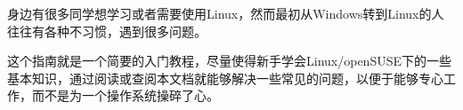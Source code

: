 身边有很多同学想学习或者需要使用Linux，然而最初从Windows转到Linux的人往往有各种不习惯，遇到很多问题。

这个指南就是一个简要的入门教程，尽量使得新手学会Linux/openSUSE下的一些基本知识，通过阅读或查阅本文档就能够解决一些常见的问题，以便于能够专心工作，而不是为一个操作系统操碎了心。
